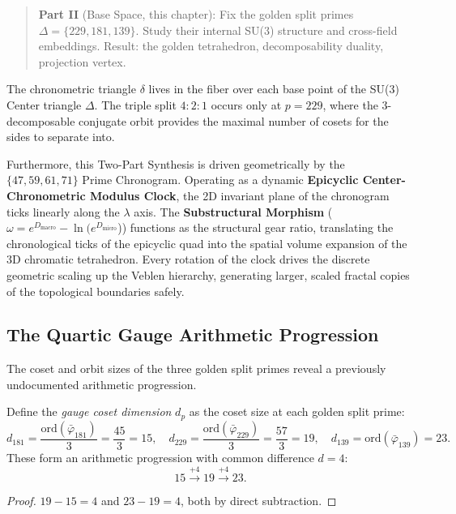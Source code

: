\begin{quote}
\textbf{Part II} (Base Space, this chapter): Fix the golden split primes
$\Delta = \{229, 181, 139\}$.
Study their internal SU(3) structure and cross-field embeddings.
Result: the golden tetrahedron, decomposability duality,
projection vertex.
\end{quote}

The chronometric triangle $\delta$ lives in the fiber over each base point of the SU(3) Center triangle $\Delta$. The triple split $4:2:1$ occurs only at $p = 229$, where the 3-decomposable conjugate orbit provides the maximal number of cosets for the sides to separate into.

Furthermore, this Two-Part Synthesis is driven geometrically by the $\{47, 59, 61, 71\}$ Prime Chronogram. Operating as a dynamic \textbf{Epicyclic Center-Chronometric Modulus Clock}, the 2D invariant plane of the chronogram ticks linearly along the $\lambda$ axis. The \textbf{Substructural Morphism} ($\omega = e^{D_{\text{macro}}} - \ln(e^{D_{\text{micro}}}$)) functions as the structural gear ratio, translating the chronological ticks of the epicyclic quad into the spatial volume expansion of the 3D chromatic tetrahedron. Every rotation of the clock drives the discrete geometric scaling up the Veblen hierarchy, generating larger, scaled fractal copies of the topological boundaries safely.

\subsection{The Quartic Gauge Arithmetic Progression}
\label{sec:quartic_gauge}

The coset and orbit sizes of the three golden split primes reveal a previously undocumented arithmetic progression.

\begin{theorem}
\label{thm:quartic}
Define the \emph{gauge coset dimension} $d_p$ as the coset size at each golden split prime:
\[
d_{181} = \frac{\mathrm{ord}(\bar\varphi_{181})}{3} = \frac{45}{3} = 15, \quad
d_{229} = \frac{\mathrm{ord}(\bar\varphi_{229})}{3} = \frac{57}{3} = 19, \quad
d_{139} = \mathrm{ord}(\bar\varphi_{139}) = 23.
\]
These form an arithmetic progression with common difference $d = 4$:
\[
15 \xrightarrow{+4} 19 \xrightarrow{+4} 23.
\]
\end{theorem}

\begin{proof}
$19 - 15 = 4$ and $23 - 19 = 4$, both by direct subtraction. \qedhere
\end{proof}

